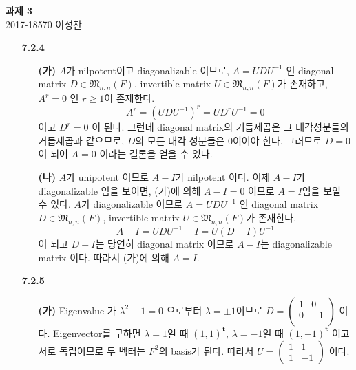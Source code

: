 \documentclass{article}
\newcommand*{\trans}{^{\mathrm{\mathbf{t}}}}%
\newcommand*{\matrixM}{\mathfrak{M}}%
\begin{document}
\begin{center}
\textbf{ 과제 3}\\
\large 2017-18570 이성찬
\end{center}

\begin{itemize}
\item[\textbf{7.2.4}] 
	\begin{itemize}
		\item[\textbf{(가)}] $A$가 nilpotent이고 diagonalizable 이므로, $A=UDU^{-1}$ 인 diagonal matrix $D \in \matrixM_{n, n}(F)$,  invertible matrix $U\in \matrixM_{n, n}(F)$가 존재하고, $A^r = 0$ 인 $r\geq 1$이 존재한다. $$A^r = (UDU^{-1})^r = UD^rU^{-1} = 0$$ 이고 $D^r = 0$ 이 된다. 그런데 diagonal matrix의 거듭제곱은 그 대각성분들의 거듭제곱과 같으므로, $D$의 모든 대각 성분들은 $0$이어야 한다. 그러므로 $D=0$ 이 되어 $A=0$ 이라는 결론을 얻을 수 있다.
		\item[\textbf{(나)}] $A$가 unipotent 이므로 $A-I$가 nilpotent 이다. 이제 $A-I$가 diagonalizable 임을 보이면, (가)에 의해 $A-I=0$ 이므로 $A=I$임을 보일 수 있다. $A$가 diagonalizable 이므로 $A=UDU^{-1}$ 인 diagonal matrix $D \in \matrixM_{n, n}(F)$,  invertible matrix $U\in \matrixM_{n, n}(F)$가 존재한다. $$A-I = UDU^{-1} - I = U(D - I)U^{-1}$$ 이 되고 $D-I$는 당연히 diagonal matrix 이므로 $A-I$는 diagonalizable matrix 이다. 따라서 (가)에 의해 $A=I$.
	\end{itemize}

\item[\textbf{7.2.5}]
	\begin{itemize}
		\item[\textbf{(가)}] Eigenvalue 가 $\lambda^2 - 1 = 0$ 으로부터 $\lambda = \pm 1$이므로 
				$D = \begin{pmatrix}
						1 & 0\\
						0 & -1\\
				\end{pmatrix}$ 이다. 
				Eigenvector를 구하면 $\lambda = 1$일 때 
				$(1, 1)\trans$, $\lambda = -1$일 때 $(1, -1)\trans$ 이고 서로 독립이므로 두 벡터는 $F^2$의 basis가 된다. 따라서
				$U = \begin{pmatrix}
						1 & 1\\
						1 & -1
				\end{pmatrix}$ 이다.
			

\end{itemize}
\end{itemize}
\end{document}
